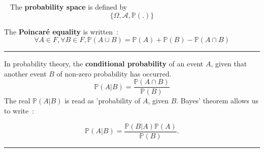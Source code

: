 \begin{f}[Axiomatic]{\ }
	The \textbf{probability space} is defined by
	\[ \lbrace \Omega, \mathcal{A}, \mathbb{P}(.) \rbrace \]
	
	The \textbf{Poincaré equality} is written~:
	\[\forall A \in F, \forall B \in F, \mathbb{P} (A \cup B) = \mathbb{P} (A) + \mathbb{P} (B) - \mathbb{P} (A \cap B)\]
	
\end{f}
\hrule

\begin{f}[Bayes]
	In probability theory, the \textbf{conditional probability} of an event \(A\), given that another event \(B\) of non-zero probability has occurred.
	\[
	\mathbb{P}(A|B) = \frac{\mathbb{P}(A \cap B)}{\mathbb{P}(B)}
	\]
	The real \(\mathbb{P}(A|B)\) is read as 'probability of \(A\), given \(B\).
	Bayes' theorem allows us to write~:
	
	\[   \mathbb{P}(A|B) = \frac{\mathbb{P}(B|A)\mathbb{P}(A)}{\mathbb{P}(B)}. \]
\end{f}
\hrule

